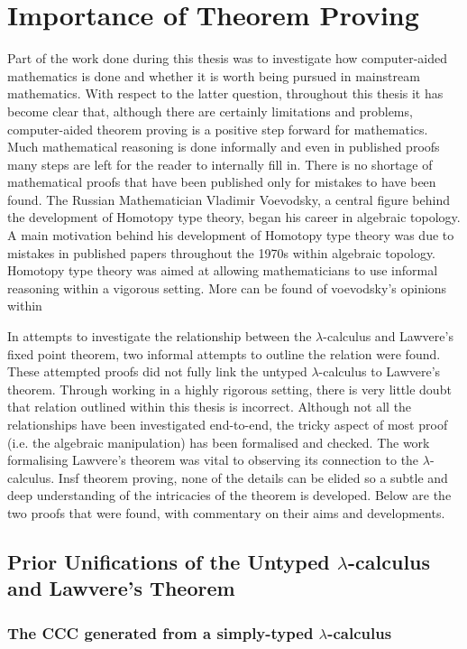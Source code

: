 \section{Importance of Theorem Proving}
Part of the  work done during this thesis was to investigate how computer-aided
mathematics is done and whether it is worth being pursued in mainstream
mathematics. With respect to the latter question, throughout this thesis it has
become clear that, although there are certainly limitations and problems,
computer-aided theorem proving is a positive step forward for mathematics. Much
mathematical reasoning is done informally and even in published proofs many
steps are left for the reader to internally fill in. There is no shortage of
mathematical proofs that have been published only for mistakes to have been
found. The Russian Mathematician Vladimir Voevodsky, a central figure behind the
development of Homotopy type theory, began his career in algebraic topology. A
main motivation behind his development of Homotopy type theory was due to
mistakes in published papers throughout the 1970s within algebraic topology.
Homotopy type theory was aimed at allowing mathematicians to use informal
reasoning within a vigorous setting. More can be found of voevodsky's opinions
within 

In attempts to investigate the relationship between the $\lambda$-calculus and
Lawvere's fixed point theorem, two informal attempts to outline the relation
were found. These attempted proofs did not fully link the untyped
$\lambda$-calculus to Lawvere's theorem. Through working in a highly rigorous
setting, there is very little doubt that relation outlined within this thesis is
incorrect. Although not all the relationships have been investigated end-to-end,
the tricky aspect of most proof (i.e. the algebraic manipulation) has been
formalised and checked. The work formalising Lawvere's theorem was vital to
observing its connection to the $\lambda$-calculus. Insf
theorem proving, none of the details can be elided so a subtle and deep
understanding of the intricacies of the theorem is developed. Below are the two
proofs that were found, with commentary on their aims and developments.

\subsection{Prior Unifications of the Untyped $\lambda$-calculus and
Lawvere's Theorem}
\subsubsection{The CCC generated from a simply-typed $\lambda$-calculus}

